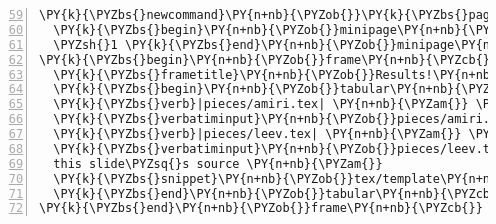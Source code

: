 \begin{Verbatim}[commandchars=\\\{\},numbers=left,numbersep=0.5em,firstnumber=59]
\PY{k}{\PYZbs{}newcommand}\PY{n+nb}{\PYZob{}}\PY{k}{\PYZbs{}pageme}\PY{n+nb}{\PYZcb{}}[1]\PY{n+nb}{\PYZob{}}\PY{c}{\PYZpc{}}
  \PY{k}{\PYZbs{}begin}\PY{n+nb}{\PYZob{}}minipage\PY{n+nb}{\PYZcb{}}[t][1em]\PY{n+nb}{\PYZob{}}\PY{k}{\PYZbs{}linewidth}\PY{n+nb}{\PYZcb{}}
  \PYZsh{}1 \PY{k}{\PYZbs{}end}\PY{n+nb}{\PYZob{}}minipage\PY{n+nb}{\PYZcb{}}\PY{n+nb}{\PYZcb{}}   \PY{c}{\PYZpc{} verbatim}
\PY{k}{\PYZbs{}begin}\PY{n+nb}{\PYZob{}}frame\PY{n+nb}{\PYZcb{}}[fragile] \PY{c}{\PYZpc{} troubles...}
  \PY{k}{\PYZbs{}frametitle}\PY{n+nb}{\PYZob{}}Results!\PY{n+nb}{\PYZcb{}}
  \PY{k}{\PYZbs{}begin}\PY{n+nb}{\PYZob{}}tabular\PY{n+nb}{\PYZcb{}}\PY{n+nb}{\PYZob{}}r | m\PY{n+nb}{\PYZob{}}0.7\PY{k}{\PYZbs{}linewidth}\PY{n+nb}{\PYZcb{}}\PY{n+nb}{\PYZcb{}}
  \PY{k}{\PYZbs{}verb}|pieces/amiri.tex| \PY{n+nb}{\PYZam{}} \PY{k}{\PYZbs{}pageme}\PY{n+nb}{\PYZob{}}\PY{c}{\PYZpc{}}
  \PY{k}{\PYZbs{}verbatiminput}\PY{n+nb}{\PYZob{}}pieces/amiri.tex\PY{n+nb}{\PYZcb{}}\PY{n+nb}{\PYZcb{}} \PY{k}{\PYZbs{}\PYZbs{}}
  \PY{k}{\PYZbs{}verb}|pieces/leev.tex| \PY{n+nb}{\PYZam{}} \PY{k}{\PYZbs{}pageme}\PY{n+nb}{\PYZob{}}\PY{c}{\PYZpc{}}
  \PY{k}{\PYZbs{}verbatiminput}\PY{n+nb}{\PYZob{}}pieces/leev.tex\PY{n+nb}{\PYZcb{}}\PY{n+nb}{\PYZcb{}} \PY{k}{\PYZbs{}\PYZbs{}}
  this slide\PYZsq{}s source \PY{n+nb}{\PYZam{}} 
  \PY{k}{\PYZbs{}snippet}\PY{n+nb}{\PYZob{}}tex/template\PY{n+nb}{\PYZus{}}results\PY{n+nb}{\PYZcb{}}
  \PY{k}{\PYZbs{}end}\PY{n+nb}{\PYZob{}}tabular\PY{n+nb}{\PYZcb{}}
\PY{k}{\PYZbs{}end}\PY{n+nb}{\PYZob{}}frame\PY{n+nb}{\PYZcb{}}
\end{Verbatim}
